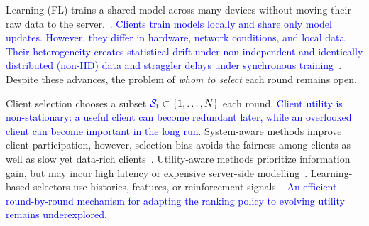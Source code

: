 \documentclass[journal]{IEEEtran}
\newcommand{\revision}[1]{\textcolor{blue}{#1}}
\begin{document}
 Learning (FL) trains a shared model across many devices without moving their raw data to the server.~\cite{mcmahan2017communication}. \revision{Clients train models locally and share only model updates. However, they differ in hardware, network conditions, and local data. Their heterogeneity creates statistical drift under non-independent and identically distributed (non-IID) data and straggler delays under synchronous training}~\cite{karimireddy2020scaffold,mai2024study,tapwal2026stragglers,forootani2026asynchronous,borazjani2026redefining}. Despite these advances, the problem of \textit{whom to select} each round remains open.

Client selection chooses a subset $\revision{\mathcal{S}_t} \subset \{1, \ldots, N\}$ each round. \revision{Client utility is non-stationary: a useful client can become redundant later, while an overlooked client can become important in the long run.} System-aware methods improve client participation, however, selection bias avoids the fairness among clients as well as slow yet data-rich clients~\cite{nishio2019client,chai2020tifl}. Utility-aware methods prioritize information gain, but may incur high latency or expensive server-side modelling~\cite{lai2021oort,tang2022fedcor,xu2024federated,yan2023criticalfl,ning2024fedgcs}. Learning-based selectors use histories, features, or reinforcement signals~\cite{wang2020optimizing,pan2024contextual,kazemi2026robust}. \revision{An efficient round-by-round mechanism for adapting the ranking policy to evolving utility remains underexplored.}
\end{document}
